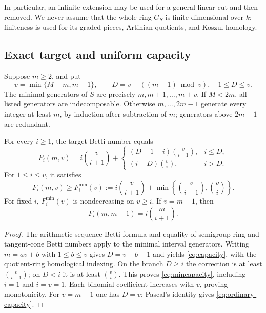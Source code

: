 In particular, an infinite extension may be used for a general linear
cut and then removed. We never assume that the whole ring $G_S$ is
finite dimensional over $k$; finiteness is used for its graded pieces,
Artinian quotients, and Koszul homology.

\subsection{Exact target and uniform capacity}
Suppose $m\ge2$, and put
\[
 v=\min\{M-m,m-1\},\qquad
 D=v-((m-1)\bmod v),\quad 1\le D\le v.
\]
The minimal generators of $\widetilde S$ are precisely
$m,m+1,\ldots,m+v$. If $M<2m$, all listed generators are
indecomposable. Otherwise $m,\ldots,2m-1$ generate every integer
at least $m$, by induction after subtraction of $m$; generators above
$2m-1$ are redundant.

\begin{proposition}\label{prop:capacity}
For every $i\ge1$, the target Betti number equals
\begin{equation}\label{eq:capacity}
 F_i(m,v)=i\binom v{i+1}+
 \begin{cases}
 (D+1-i)\binom v{i-1},&i\le D,\\
 (i-D)\binom vi,&i>D.
 \end{cases}
\end{equation}
For $1\le i\le v$, it satisfies
\begin{equation}\label{eq:mincapacity}
 F_i(m,v)\ge F_i^{\min}(v):=
 i\binom v{i+1}+\min\left\{\binom v{i-1},\binom vi\right\}.
\end{equation}
For fixed $i$, $F_i^{\min}(v)$ is nondecreasing on $v\ge i$.
If $v=m-1$, then
\begin{equation}\label{eq:ordinary-capacity}
 F_i(m,m-1)=i\binom m{i+1}.
\end{equation}
\end{proposition}
\begin{proof}
The arithmetic-sequence Betti formula \cite[Theorem~4.1]{APFormula}
and equality of semigroup-ring and tangent-cone Betti numbers
\cite[Proposition~2.5]{APCone} apply to the minimal interval generators.
Writing $m=av+b$ with $1\le b\le v$ gives $D=v-b+1$ and yields
\eqref{eq:capacity}, with the quotient-ring homological indexing.
On the branch $D\ge i$ the correction is at least $\binom v{i-1}$;
on $D<i$ it is at least $\binom vi$. This proves
\eqref{eq:mincapacity}, including $i=1$ and $i=v=1$.
Each binomial coefficient increases with $v$, proving monotonicity.
For $v=m-1$ one has $D=v$; Pascal's identity gives
\eqref{eq:ordinary-capacity}.
\end{proof}

